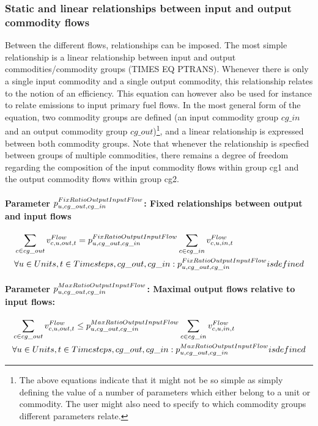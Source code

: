 \subsubsection{Static and linear relationships between input and output commodity flows}
Between the different flows, relationships can be imposed. The most simple relationship is a linear relationship between input and output commodities/commodity groups (TIMES EQ PTRANS). Whenever there is only a single input commodity and a single output commodity, this relationship relates to the notion of an efficiency. This equation can however also be used for instance to relate emissions to input primary fuel flows. In the most general form of the equation, two commodity groups are defined (an input commodity group $cg\_in$ and an output commodity group $cg\_out$)\footnote{The above equations indicate that it might not be so simple as simply defining the value of a number of parameters which either belong to a unit or commodity. The user might also need to specify to which commodity groups different parameters relate.}, and a linear relationship is expressed between both commodity groups. Note that whenever the relationship is specfied between groups of multiple commodities, there remains a degree of freedom regarding the composition of the input commodity flows within group cg1 and the output commodity flows within group cg2. 

\paragraph{Parameter $\pFixRatioOutputInputFlow$: Fixed relationships between output and input flows}
\begin{align} \label{eq:fixratiooutputinputflow}
&\sum_{\commodity \in cg\_out} \vFlow[\commodity,\unit,out,\timestep] = \pFixRatioOutputInputFlow \sum_{\commodity \in cg\_in} \vFlow[\commodity,\unit,in,\timestep] \nonumber \\
&\forall \units, \timesteps, cg\_out, cg\_in : \pFixRatioOutputInputFlow is defined
\end{align}

\paragraph{Parameter $\pMaxRatioOutputInputFlow$: Maximal output flows relative to input flows:}
\begin{align} \label{eq:maxratiooutputinputflow}
&\sum_{\commodity \in cg\_out} \vFlow[\commodity,\unit,out,\timestep] \le \pMaxRatioOutputInputFlow \sum_{\commodity \in cg\_in} \vFlow[\commodity,\unit,in,\timestep] \nonumber \\
&\forall \units, \timesteps, cg\_out, cg\_in : \pMaxRatioOutputInputFlow is defined
\end{align}

